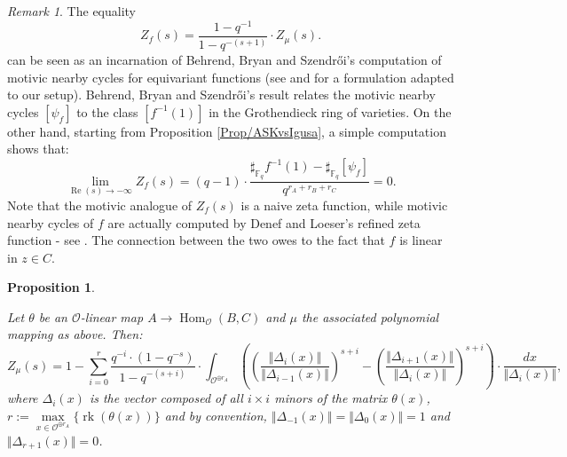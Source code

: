 \documentclass[11pt,english]{article}
\numberwithin{equation}{section}
\numberwithin{figure}{section}
\theoremstyle{definition}
\theoremstyle{plain}
\newtheorem{prop}[df]{Proposition}
\theoremstyle{remark}
\newtheorem{rmk}[df]{Remark}
\DeclareMathOperator{\Rea}{Re}
\DeclareMathOperator{\Hom}{Hom}
\DeclareMathOperator{\rk}{rk}
\newcommand\FF{\mathbb{F}}
\begin{document}
\begin{rmk}

The equality\[
Z_{f}(s)=\frac{1-q^{-1}}{1-q^{-(s+1)}}\cdot Z_{\mu}(s).
\]can be seen as an incarnation of Behrend, Bryan and Szendr\H{o}i's
computation of motivic nearby cycles for equivariant functions (see
\cite{BBS13} and \cite[Thm. 3.1.]{DM15b} for a formulation adapted
to our setup). Behrend, Bryan and Szendr\H{o}i's result relates the
motivic nearby cycles $[\psi_{f}]$ to the class $[f^{-1}(1)]$ in
the Grothendieck ring of varieties. On the other hand, starting from
Proposition \ref{Prop/ASKvsIgusa}, a simple computation shows that:\[
\underset{\Rea(s)\rightarrow-\infty}{\lim}Z_{f}(s)=(q-1)\cdot\frac{\sharp_{\FF_q}f^{-1}(1)-\sharp_{\FF_q}[\psi_f]}{q^{r_A+r_B+r_C}}=0.
\] Note that the motivic analogue of $Z_{f}(s)$ is a naive zeta function,
while motivic nearby cycles of $f$ are actually computed by Denef
and Loeser's refined zeta function - see \cite[Ch. 7, \S 4.]{CLNS18}.
The connection between the two owes to the fact that $f$ is linear
in $z\in C$.

\end{rmk}

\begin{prop} \label{Prop/ZetaMomMap}

Let $\theta$ be an $\mathcal{O}$-linear map $A\rightarrow\Hom_{\mathcal{O}}(B,C)$
and $\mu$ the associated polynomial mapping as above. Then:\[
Z_{\mu}(s) = 
1-\sum_{i=0}^{r}\frac{q^{-i}\cdot(1-q^{-s})}{1-q^{-(s+i)}}\cdot \int_{\mathcal{O}^{\oplus r_A}} \left(\left(\frac{\Vert\Delta_{i}(x)\Vert}{\Vert\Delta_{i-1}(x)\Vert}\right)^{s+i}-\left(\frac{\Vert\Delta_{i+1}(x)\Vert}{\Vert\Delta_{i}(x)\Vert}\right)^{s+i} \right)\cdot\frac{dx}{\Vert\Delta_{i}(x)\Vert},
\]where $\Delta_{i}(x)$ is the vector composed of all $i\times i$
minors of the matrix $\theta(x)$, $r:=\underset{x\in\mathcal{O}^{\oplus r_{A}}}{\max}\{\rk(\theta(x))\}$
and by convention, $\Vert\Delta_{-1}(x)\Vert=\Vert\Delta_{0}(x)\Vert=1$
and $\Vert\Delta_{r+1}(x)\Vert=0$.

\end{prop}
\end{document}
